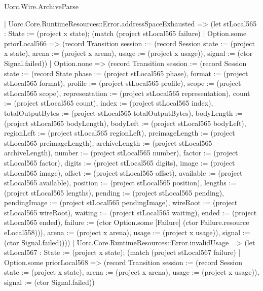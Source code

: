 \begin{lexlean}{Uorc.Wire.ArchiveParse}
\begin{semanticmodule}
{      | Uorc.Core.RuntimeResources::Error.addressSpaceExhausted => (let stLocal565 : State := (project x state); (match (project stLocal565 failure)
        | Option.some priorLocal566 => (record Transition {session := (record Session {state := (project x state), arena := (project x arena), usage := (project x usage)}), signal := (ctor Signal.failed)})
        | Option.none => (record Transition {session := (record Session {state := (record State {phase := (project stLocal565 phase), format := (project stLocal565 format), profile := (project stLocal565 profile), scope := (project stLocal565 scope), representation := (project stLocal565 representation), count := (project stLocal565 count), index := (project stLocal565 index), totalOutputBytes := (project stLocal565 totalOutputBytes), bodyLength := (project stLocal565 bodyLength), bodyLeft := (project stLocal565 bodyLeft), regionLeft := (project stLocal565 regionLeft), preimageLength := (project stLocal565 preimageLength), archiveLength := (project stLocal565 archiveLength), number := (project stLocal565 number), factor := (project stLocal565 factor), digits := (project stLocal565 digits), image := (project stLocal565 image), offset := (project stLocal565 offset), available := (project stLocal565 available), position := (project stLocal565 position), lengths := (project stLocal565 lengths), pending := (project stLocal565 pending), pendingImage := (project stLocal565 pendingImage), wireRoot := (project stLocal565 wireRoot), waiting := (project stLocal565 waiting), ended := (project stLocal565 ended), failure := (ctor Option.some [Failure] (ctor Failure.resource eLocal558))}), arena := (project x arena), usage := (project x usage)}), signal := (ctor Signal.failed)})))
      | Uorc.Core.RuntimeResources::Error.invalidUsage => (let stLocal567 : State := (project x state); (match (project stLocal567 failure)
        | Option.some priorLocal568 => (record Transition {session := (record Session {state := (project x state), arena := (project x arena), usage := (project x usage)}), signal := (ctor Signal.failed)})
}
\end{semanticmodule}
\end{lexlean}
